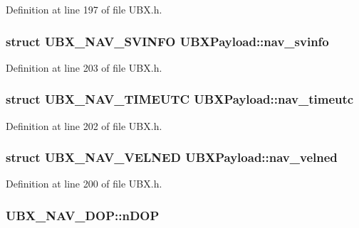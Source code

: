 Definition at line 197 of file U\-B\-X.\-h.

\hypertarget{group___g_s_p_module_gae82725b3f4df8d06429de80876bd7bb4}{
\subsubsection[{nav\-\_\-svinfo}]{\setlength{\rightskip}{0pt plus 5cm}struct {\bf U\-B\-X\-\_\-\-N\-A\-V\-\_\-\-S\-V\-I\-N\-F\-O} U\-B\-X\-Payload\-::nav\-\_\-svinfo}}\label{group___g_s_p_module_gae82725b3f4df8d06429de80876bd7bb4}


Definition at line 203 of file U\-B\-X.\-h.

\hypertarget{group___g_s_p_module_gaf65229991956493628326aa718c2e156}{
\subsubsection[{nav\-\_\-timeutc}]{\setlength{\rightskip}{0pt plus 5cm}struct {\bf U\-B\-X\-\_\-\-N\-A\-V\-\_\-\-T\-I\-M\-E\-U\-T\-C} U\-B\-X\-Payload\-::nav\-\_\-timeutc}}\label{group___g_s_p_module_gaf65229991956493628326aa718c2e156}


Definition at line 202 of file U\-B\-X.\-h.

\hypertarget{group___g_s_p_module_gae525d323fa4053d1f5441bae99d81a95}{
\subsubsection[{nav\-\_\-velned}]{\setlength{\rightskip}{0pt plus 5cm}struct {\bf U\-B\-X\-\_\-\-N\-A\-V\-\_\-\-V\-E\-L\-N\-E\-D} U\-B\-X\-Payload\-::nav\-\_\-velned}}\label{group___g_s_p_module_gae525d323fa4053d1f5441bae99d81a95}


Definition at line 200 of file U\-B\-X.\-h.

\hypertarget{group___g_s_p_module_gae3287c2656c08835bdd2ffa7e28d0ee4}{
\subsubsection[{n\-D\-O\-P}]{ U\-B\-X\-\_\-\-N\-A\-V\-\_\-\-D\-O\-P\-::n\-D\-O\-P}}\label{group___g_s_p_module_gae3287c2656c08835bdd2ffa7e28d0ee4}


